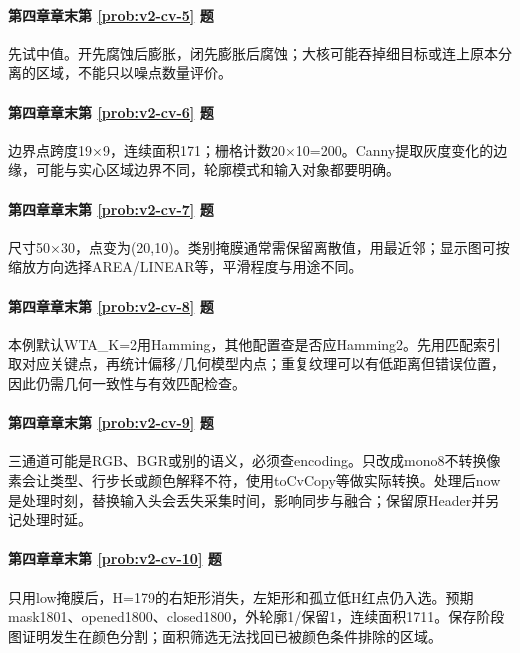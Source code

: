 \paragraph*{第四章章末第 \ref{prob:v2-cv-5} 题}
\begin{solution}
先试中值。开先腐蚀后膨胀，闭先膨胀后腐蚀；大核可能吞掉细目标或连上原本分离的区域，不能只以噪点数量评价。
\end{solution}
\paragraph*{第四章章末第 \ref{prob:v2-cv-6} 题}
\begin{solution}
边界点跨度19×9，连续面积171；栅格计数20×10=200。Canny提取灰度变化的边缘，可能与实心区域边界不同，轮廓模式和输入对象都要明确。
\end{solution}
\paragraph*{第四章章末第 \ref{prob:v2-cv-7} 题}
\begin{solution}
尺寸50×30，点变为(20,10)。类别掩膜通常需保留离散值，用最近邻；显示图可按缩放方向选择AREA/LINEAR等，平滑程度与用途不同。
\end{solution}
\paragraph*{第四章章末第 \ref{prob:v2-cv-8} 题}
\begin{solution}
本例默认WTA\_K=2用Hamming，其他配置查是否应Hamming2。先用匹配索引取对应关键点，再统计偏移/几何模型内点；重复纹理可以有低距离但错误位置，因此仍需几何一致性与有效匹配检查。
\end{solution}
\paragraph*{第四章章末第 \ref{prob:v2-cv-9} 题}
\begin{solution}
三通道可能是RGB、BGR或别的语义，必须查encoding。只改成mono8不转换像素会让类型、行步长或颜色解释不符，使用toCvCopy等做实际转换。处理后now是处理时刻，替换输入头会丢失采集时间，影响同步与融合；保留原Header并另记处理时延。
\end{solution}
\paragraph*{第四章章末第 \ref{prob:v2-cv-10} 题}
\begin{solution}
只用low掩膜后，H=179的右矩形消失，左矩形和孤立低H红点仍入选。预期mask1801、opened1800、closed1800，外轮廓1/保留1，连续面积1711。保存阶段图证明发生在颜色分割；面积筛选无法找回已被颜色条件排除的区域。
\end{solution}

